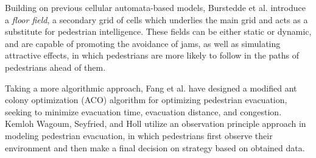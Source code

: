 \documentclass[12pt]{article}
\begin{document}
Building on previous cellular automata-based models, Burstedde et al.
\cite{burstedde2001simulation} introduce a \textit{floor field}, a secondary
grid of cells which underlies the main grid and acts as a substitute for
pedestrian intelligence. These fields can be either static or dynamic, and are
capable of promoting the avoidance of jams, as well as simulating attractive
effects, in which pedestrians are more likely to follow in the paths of
pedestrians ahead of them.

Taking a more algorithmic approach, Fang et al. \cite{fang2011hierarchical} have
designed a modified ant colony optimization (ACO) algorithm for optimizing
pedestrian evacuation, seeking to minimize evacuation time, evacuation distance,
and congestion. Kemloh Wagoum, Seyfried, and Holl \cite{kemloh2012modeling}
utilize an observation principle approach in modeling pedestrian evacuation,
in which pedestrians first observe their environment and then make a final
decision on strategy based on obtained data.

{}

\end{document}

